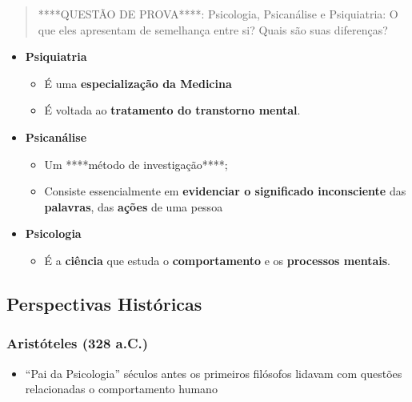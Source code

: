 \documentclass[
]{book}
\providecommand{\tightlist}{%
  \setlength{\itemsep}{0pt}\setlength{\parskip}{0pt}}
\begin{document}
\begin{quote}
****QUESTÃO DE PROVA****: Psicologia, Psicanálise e Psiquiatria: O que eles apresentam
de semelhança entre si? Quais são suas diferenças?
\end{quote}

\begin{itemize}
\tightlist
\item
  \textbf{Psiquiatria}

  \begin{itemize}
  \tightlist
  \item
    É uma \textbf{especialização da Medicina}
  \item
    É voltada ao \textbf{tratamento do transtorno mental}.
  \end{itemize}
\item
  \textbf{Psicanálise}

  \begin{itemize}
  \tightlist
  \item
    Um ****método de investigação****;
  \item
    Consiste essencialmente em \textbf{evidenciar o significado inconsciente} das \textbf{palavras}, das \textbf{ações} de uma pessoa
  \end{itemize}
\item
  \textbf{Psicologia}

  \begin{itemize}
  \tightlist
  \item
    É a \textbf{ciência} que estuda o \textbf{comportamento} e os \textbf{processos mentais}.
  \end{itemize}
\end{itemize}

\hypertarget{perspectivas-histuxf3ricas-1}{%
\subsection{Perspectivas Históricas}\label{perspectivas-histuxf3ricas-1}}

\hypertarget{aristuxf3teles-328-a.c.-1}{%
\subsubsection{Aristóteles (328 a.C.)}\label{aristuxf3teles-328-a.c.-1}}

\begin{itemize}
\tightlist
\item
  ``Pai da Psicologia'' séculos antes os primeiros filósofos lidavam com questões relacionadas o comportamento humano
\end{itemize}
\end{document}
